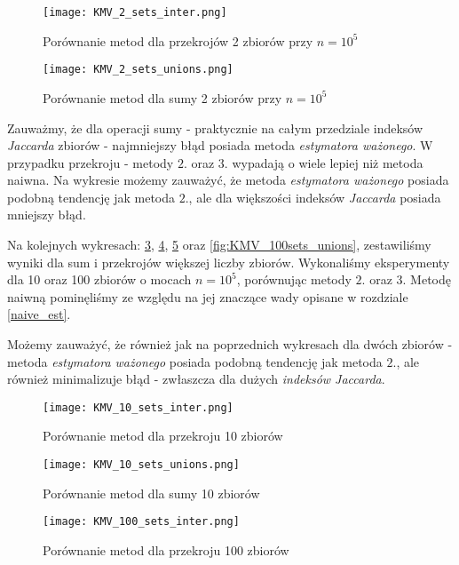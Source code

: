 \begin{figure}[h!]
    \texttt{[image: KMV\_2\_sets\_inter.png]}
    \centering
    \caption{Porównanie metod dla przekrojów 2 zbiorów przy $n=10^5$}
    \label{fig:KMV_2sets_inter}
\end{figure}

\begin{figure}[h!]
    \texttt{[image: KMV\_2\_sets\_unions.png]}
    \centering
    \caption{Porównanie metod dla sumy 2 zbiorów przy $n=10^5$}
    \label{fig:KMV_2sets_unions}
\end{figure}

Zauważmy, że dla operacji sumy - praktycznie na całym przedziale indeksów \textit{Jaccarda} zbiorów - najmniejszy błąd posiada metoda \textit{estymatora ważonego}. W przypadku przekroju - metody $2.$ oraz $3.$ wypadają o wiele lepiej niż metoda naiwna. Na wykresie możemy zauważyć, że metoda \textit{estymatora ważonego} posiada podobną tendencję jak metoda $2.$, ale dla większości indeksów \textit{Jaccarda} posiada mniejszy błąd.

Na kolejnych wykresach: \ref{fig:KMV_10sets_inter}, \ref{fig:KMV_10sets_unions}, \ref{fig:KMV_100sets_inter} oraz \ref{fig:KMV_100sets_unions}, zestawiliśmy wyniki dla sum i przekrojów większej liczby zbiorów. Wykonaliśmy eksperymenty dla 10 oraz 100 zbiorów o mocach $n = 10^5$, porównując metody $2.$ oraz $3.$ Metodę naiwną pominęliśmy ze względu na jej znaczące wady opisane w rozdziale \ref{naive_est}. 

Możemy zauważyć, że również jak na poprzednich wykresach dla dwóch zbiorów - metoda \textit{estymatora ważonego} posiada podobną tendencję jak metoda $2.$, ale również minimalizuje błąd - zwłaszcza dla dużych \textit{indeksów Jaccarda}.

\begin{figure}[h!]
    \texttt{[image: KMV\_10\_sets\_inter.png]}
    \centering
    \caption{Porównanie metod dla przekroju 10 zbiorów}
    \label{fig:KMV_10sets_inter}
\end{figure}

\begin{figure}[h!]
    \texttt{[image: KMV\_10\_sets\_unions.png]}
    \centering
    \caption{Porównanie metod dla sumy 10 zbiorów}
    \label{fig:KMV_10sets_unions}
\end{figure}

\begin{figure}[h!]
    \texttt{[image: KMV\_100\_sets\_inter.png]}
    \centering
    \caption{Porównanie metod dla przekroju 100 zbiorów}
    \label{fig:KMV_100sets_inter}
\end{figure}

